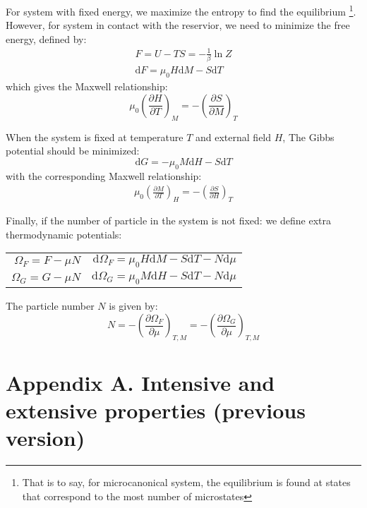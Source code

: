 \documentclass{article}
\newcommand{\pfrac}[2]{\frac{\partial #1}{\partial #2}}
\newcommand{\dnor}{\text{d}}
\begin{document}
For system with fixed energy, we maximize the entropy to find the equilibrium
\footnote{That is to say, for microcanonical system, the equilibrium is found 
at states that correspond to the most number of microstates}.
However, for system in contact with the reservior, we need to minimize the free 
energy, defined by:
\begin{gather}
    F = U - TS = -\frac{1}{\beta} \ln Z \\
    \dnor F = \mu_0 H \dnor M - S \dnor T
\end{gather}
which gives the Maxwell relationship:
\begin{equation}
    \mu_0 \left( \pfrac{H}{T} \right)_M = - \left( \pfrac{S}{M} \right)_T
\end{equation} 

When the system is fixed at temperature $T$ and external field $H$, The 
Gibbs potential should be minimized:
\begin{equation}
    \dnor G = - \mu_0 M \dnor H - S \dnor T
\end{equation}
with the corresponding Maxwell relationship:
\begin{eqnarray}
    \mu_0 \left( \pfrac{M}{T} \right)_H = - \left( \pfrac{S}{H} \right)_T
\end{eqnarray}

Finally, if the number of particle in the system is not fixed:
we define extra thermodynamic potentials:
\begin{table*}[h]
    \centering
    \begin{tabular}{rr}
     $\Omega_F = F - \mu N$ & $ \dnor \Omega_F = \mu_0 H \dnor M - S\dnor T - N \dnor \mu $ \\
     $\Omega_G = G - \mu N$ & $ \dnor \Omega_G = \mu_0 M \dnor H - S\dnor T - N \dnor \mu $ \\
     \end{tabular}
\end{table*}
The particle number $N$ is given by:
\begin{equation}
    N = - \left( \pfrac{\Omega_F}{\mu} \right)_{T,M} = - \left( \pfrac{\Omega_G}{\mu} \right)_{T,M} 
\end{equation}

\newpage

\section*{Appendix A. Intensive and extensive properties (previous version)}
\end{document}
